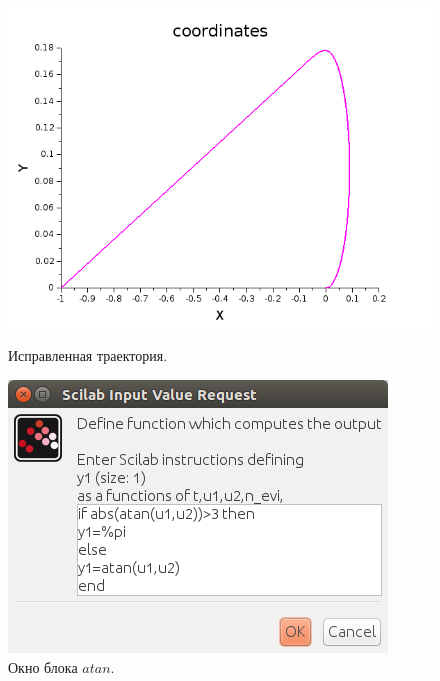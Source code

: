 \documentclass[12pt,a4paper,openany]{extarticle}
\begin{document}
\begin{enumerate}
\begin{figure}[h!]
\begin{center}
    \begin{minipage}[h]{0.4\linewidth}
    \includegraphics[width=1\linewidth]{images/New_trajectory.png}
    \caption{Исправленная траектория.}
	\label{fig:New_trajectory}
    \end{minipage}
    \hfill
    \begin{minipage}[h]{0.4\linewidth}
    \includegraphics[width=1\linewidth]{images/Atan_window.png}
    \caption{Окно блока $atan$.}
	\label{fig:Atan_window}
    \end{minipage}
\end{center}
\end{figure}


\end{enumerate}
\end{document}
